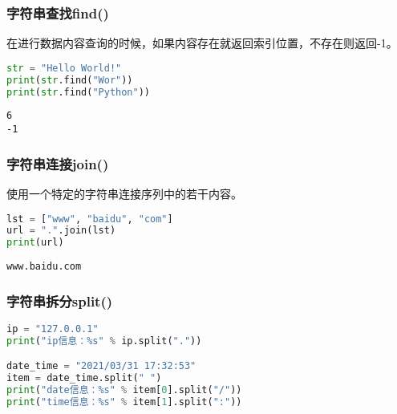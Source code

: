 \subsubsection{字符串查找find()}

在进行数据内容查询的时候，如果内容存在就返回索引位置，不存在则返回-1。\\


\begin{lstlisting}[language=Python]
str = "Hello World!"
print(str.find("Wor"))
print(str.find("Python"))
\end{lstlisting}

\begin{tcolorbox}
	\begin{verbatim}
6
-1
\end{verbatim}
\end{tcolorbox}

\subsubsection{字符串连接join()}

使用一个特定的字符串连接序列中的若干内容。\\


\begin{lstlisting}[language=Python]
lst = ["www", "baidu", "com"]
url = ".".join(lst)
print(url)
\end{lstlisting}

\begin{tcolorbox}
	\begin{verbatim}
www.baidu.com
\end{verbatim}
\end{tcolorbox}

\subsubsection{字符串拆分split()}

\vspace{0.5cm}


\begin{lstlisting}[language=Python]
ip = "127.0.0.1"
print("ip信息：%s" % ip.split("."))

date_time = "2021/03/31 17:32:53"
item = date_time.split(" ")
print("date信息：%s" % item[0].split("/"))
print("time信息：%s" % item[1].split(":"))
\end{lstlisting}

